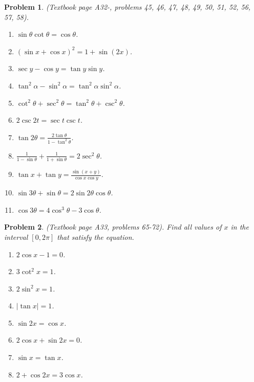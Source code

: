 \documentclass{article}
\newtheorem{problem}{Problem}
\begin{document}
\begin{problem}
(Textbook page A32-, problems 45, 46, 47, 48, 49, 50, 51, 52, 56, 57, 58).
\begin{multicols}{2}
\begin{enumerate}
\item $\sin \theta\cot \theta =\cos \theta$.
\item $(\sin x +\cos x)^2=1+\sin(2x)$.
\item $\sec y - \cos y= \tan y \sin y$.
\item $\tan^2 \alpha-\sin^2 \alpha=\tan^2\alpha\sin^2\alpha$.
\item $\cot^2\theta+\sec^2\theta=\tan^2\theta+\csc^2\theta$.
\item $2\csc 2t= \sec t \csc t$.
\item $\tan 2\theta =\frac{2\tan \theta}{1-\tan^2\theta} $.
\item $\frac{1}{1-\sin \theta}+ \frac{1}{1+\sin \theta}=2\sec^2\theta$.
\item $\tan x + \tan y = \frac{\sin (x+y)}{\cos x \cos y}$.
\item $\sin 3\theta +\sin \theta = 2 \sin 2\theta \cos \theta $.
\item $\cos 3\theta = 4\cos^3\theta-3\cos \theta $.
\end{enumerate} 
\end{multicols}
\end{problem}
\begin{problem}(Textbook page A33, problems 65-72).
Find all values of $x$ in the interval $[0,2\pi]$ that satisfy the 
equation.
\begin{multicols}{2}
\begin{enumerate}
\item $2\cos x - 1=0$.
\item $3\cot^2 x= 1$.
\item $2\sin^2 x= 1$.
\item $|\tan x|=1 $.
\item $\sin 2x = \cos x $.
\item $2\cos x +\sin 2x=0$.
\item $\sin x =\tan x$.
\item $2+\cos 2x = 3 \cos x$.
\end{enumerate}
\end{multicols}
\end{problem}
\end{document}
